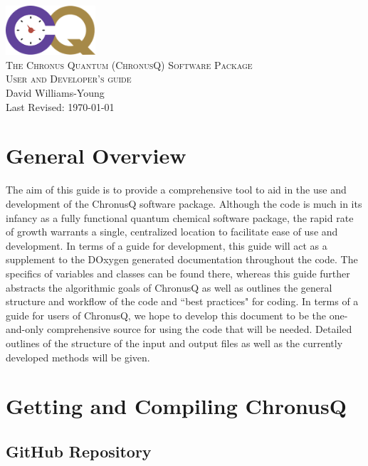 \documentclass[12pt]{article}
\begin{document}
\begin{titlepage}
\vspace*{\fill}
\begin{center}
\includegraphics[width=0.25\textwidth]{./chronus_quantum_logo.png}~\\[1cm]
\textsc{\LARGE The Chronus Quantum (ChronusQ) Software Package}~\\[0.5cm]
\textsc{\Large User and Developer's guide}~\\[5cm]
\large David Williams-Young\\
\large Last Revised: \today
\end{center}
\vspace*{\fill}
\end{titlepage}
\tableofcontents

\newpage
\section{General Overview}

The aim of this guide is to provide a comprehensive tool to aid in the use and development of the ChronusQ software package. Although the code is much in its infancy as a fully functional quantum chemical software package, the rapid rate of growth warrants a single, centralized location to facilitate ease of use and development. In terms of a guide for development, this guide will act as a supplement to the DOxygen generated documentation throughout the code. The specifics of variables and classes can be found there, whereas this guide further abstracts the algorithmic goals of ChronusQ as well as outlines the general structure and workflow of the code and ``best practices" for coding. In terms of a guide for users of ChronusQ, we hope to develop this document to be the one-and-only comprehensive source for using the code that will be needed. Detailed outlines of the structure of the input and output files as well as the currently developed methods will be given.

\section{Getting and Compiling ChronusQ}
\subsection{GitHub Repository}
\end{document}
